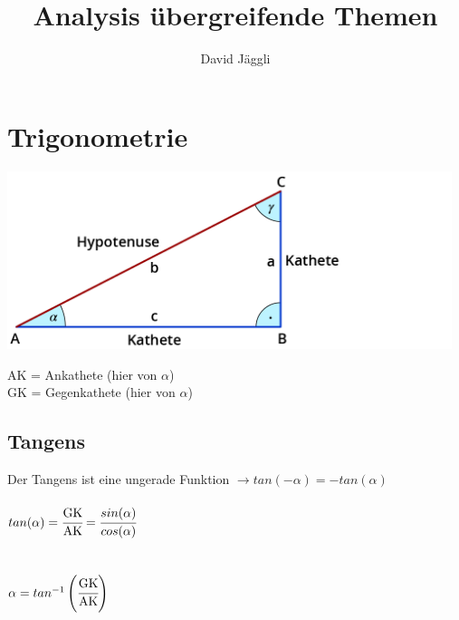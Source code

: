 \documentclass[12pt]{scrartcl}
\author{David Jäggli}
\title{Analysis übergreifende Themen}
\begin{document}
\maketitle

\tableofcontents

\newpage
\section{Trigonometrie}

\begin{center}
    \includegraphics[width=13cm]{img/rechtw_dreieck.png}\\
\end{center}

\noindent

\noindent
AK = Ankathete (hier von $\alpha$)\\
GK = Gegenkathete (hier von $\alpha$)\\

\subsection{Tangens}
Der Tangens ist eine ungerade Funktion $\rightarrow tan(-\alpha) = -tan(\alpha)$\\
\hspace{0pt}\\
\noindent
$tan(\alpha) = \cfrac{\text{GK}}{\text{AK}} = \cfrac{sin(\alpha)}{cos(\alpha)}$\\
\hspace{0pt}\\
\hspace{0pt}\\
$\alpha = tan^{-1}\left(\cfrac{\text{GK}}{\text{AK}}\right)$
\hspace{0pt}\\
\hspace{0pt}\\
\end{document}
